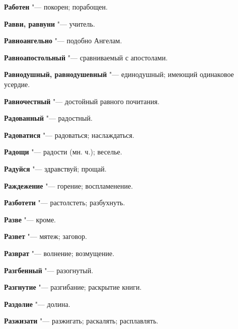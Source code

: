 \begin{mymulticols}{2}
\noindent\textbf{Работен} "--- покорен; порабощен. 




\noindent\textbf{Равви, раввуни} "--- учитель. 




\noindent\textbf{Равноангельно} "--- подобно Ангелам. 




\noindent\textbf{Равноапостольный} "--- сравниваемый с апостолами. 




\noindent\textbf{Равнодушный, равнодушевный} "--- единодушный; имеющий одинаковое усердие. 




\noindent\textbf{Равночестный} "--- достойный равного почитания. 




\noindent\textbf{Радованный} "--- радостный. 




\noindent\textbf{Радоватися} "--- радоваться; наслаждаться. 




\noindent\textbf{Радощи} "--- радости (мн. ч.); веселье. 




\noindent\textbf{Радуйся} "--- здравствуй; прощай. 




\noindent\textbf{Раждежение} "--- горение; воспламенение. 




\noindent\textbf{Разботети} "--- растолстеть; разбухнуть. 




\noindent\textbf{Разве} "--- кроме. 




\noindent\textbf{Развет} "--- мятеж; заговор. 




\noindent\textbf{Разврат} "--- волнение; возмущение. 




\noindent\textbf{Разгбенный} "--- разогнутый. 




\noindent\textbf{Разгнутие} "--- разгибание; раскрытие книги. 




\noindent\textbf{Раздолие} "--- долина. 




\noindent\textbf{Разжизати} "--- разжигать; раскалять; расплавлять. 





\end{mymulticols}
